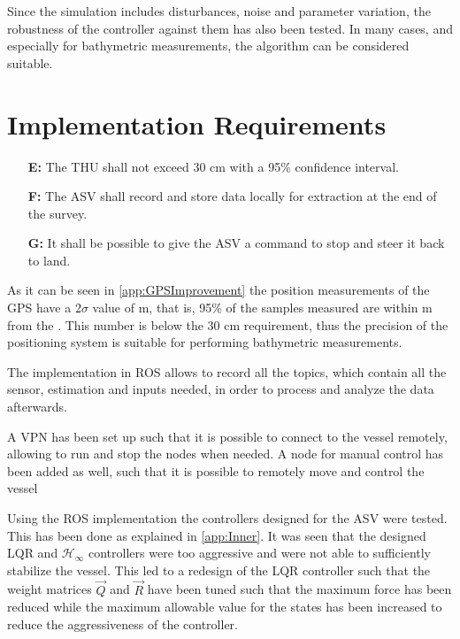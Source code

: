 Since the simulation includes disturbances, noise and parameter variation, the robustness of the controller against them has also been tested. In many cases, and especially for bathymetric measurements, the algorithm can be considered suitable.


\section{Implementation Requirements}
\begin{itemize}
  \item[\textbf{E:}] The THU shall not exceed 30 cm with a 95\% confidence interval.
  \item[\textbf{F:}] The ASV shall record and store data locally for extraction at the end of the survey.
  \item[\textbf{G:}] It shall be possible to give the ASV a command to stop and steer it back to land.
\end{itemize}

As it can be seen in \autoref{app:GPSImprovement} the position measurements of the GPS have a 2$\sigma$ value of  m, that is, 95\% of the samples measured are within  m from the . This number is below the 30 cm requirement, thus the precision of the positioning system is suitable for performing bathymetric measurements.

The implementation in ROS allows to record all the topics, which contain all the sensor, estimation and inputs needed, in order to process and analyze the data afterwards.

A VPN has been set up such that it is possible to connect to the vessel remotely, allowing to run and stop the nodes when needed. A node for manual control has been added as well, such that it is possible to remotely move and control the vessel

Using the ROS implementation the controllers designed for the ASV were tested. This has been done as explained in \autoref{app:Inner}. It was seen that the designed LQR and $\mathcal{H}_\infty$ controllers were too aggressive and were not able to sufficiently stabilize the vessel. This led to a redesign of the LQR controller such that the weight matrices $\vec{Q}$ and $\vec{R}$ have been tuned such that the maximum force has been reduced while the maximum allowable value for the states has been increased to reduce the aggressiveness of the controller.
  
